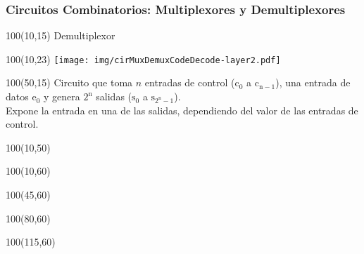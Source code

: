 \documentclass[aspectratio=169]{beamer}
\begin{document}
\begin{frame}[fragile]
    \frametitle{Circuitos Combinatorios: Multiplexores y Demultiplexores}
    \begin{textblock}{100}(10,15) Demultiplexor \end{textblock}
    \begin{textblock}{100}(10,23) \texttt{[image: img/cirMuxDemuxCodeDecode-layer2.pdf]} \end{textblock}
    \begin{textblock}{100}(50,15)
    \small Circuito que toma $n$ entradas de control ($\mathrm{c_0}$ a $\mathrm{c_{n-1}}$), una entrada de datos $\mathrm{e_0}$ y genera $\mathrm{2^n}$ salidas ($\mathrm{s_0}$ a $\mathrm{s_{2^n-1}}$).\\
    \bigskip
    Expone la entrada en una de las salidas, dependiendo del valor de las entradas de control.
    \end{textblock}
    \begin{textblock}{100}(10,50)   \end{textblock}
    \begin{textblock}{100}(10,60)   \end{textblock}
    \begin{textblock}{100}(45,60)   \end{textblock}
    \begin{textblock}{100}(80,60)   \end{textblock}
    \begin{textblock}{100}(115,60)  \end{textblock}
\end{frame}
\end{document}

